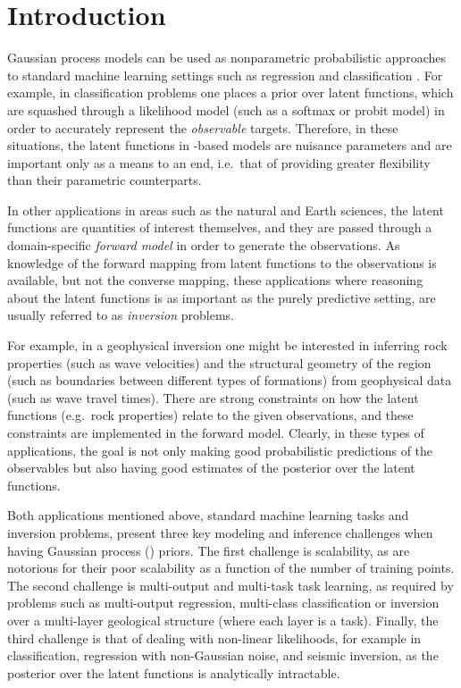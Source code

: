 \section{Introduction}
% 

Gaussian process models can be used as   
nonparametric probabilistic approaches to standard machine learning settings such as 
regression and classification \cite{rasmussen-williams-book}. For example, 
in classification problems  one places a  \gp prior over  latent functions, 
which are squashed through a likelihood model (such as a softmax or probit model)
in order to accurately represent the \emph{observable} targets.  
Therefore, in these situations, the latent functions in \gp-based models 
are nuisance parameters 
and are important only as a means to an end, i.e.~that of providing greater flexibility 
than their parametric counterparts.
  
In other applications in areas such as the natural and Earth sciences, the latent functions 
are quantities of interest themselves,  and they  
are passed through a domain-specific \emph{forward model}
in order to generate the observations.  As knowledge of the forward mapping from 
latent functions to the observations is available, but not the converse mapping, these
applications where reasoning about the latent functions is as important as 
the purely predictive setting, are usually referred to as \emph{inversion} problems. 

For example, in a geophysical inversion one might be interested in inferring rock 
properties (such as wave velocities) 
and the structural geometry of the  region   (such as boundaries between 
different types of formations) from geophysical data (such as wave travel times). 
There are strong constraints on how the latent functions (e.g.~rock properties) relate
 to the given observations, and these constraints are implemented in the forward model. 
 Clearly, in these types of applications, the goal is not only making good probabilistic predictions of the 
 observables but also having good estimates of the posterior over  the latent functions.

Both applications mentioned above,  standard machine learning tasks and inversion problems, 
present three key modeling and inference challenges when having Gaussian process (\gp) priors. 
The first challenge is scalability, as  are notorious for their poor scalability as a function 
of the number of training points. The second challenge is multi-output and multi-task task learning, 
as required by problems such as multi-output regression, multi-class classification 
or inversion over a multi-layer geological structure (where each layer is a task). 
Finally, the  third challenge is that of dealing with non-linear likelihoods, for example 
in classification, regression with non-Gaussian noise, and seismic inversion,
 as the posterior over the latent functions is analytically intractable.  

